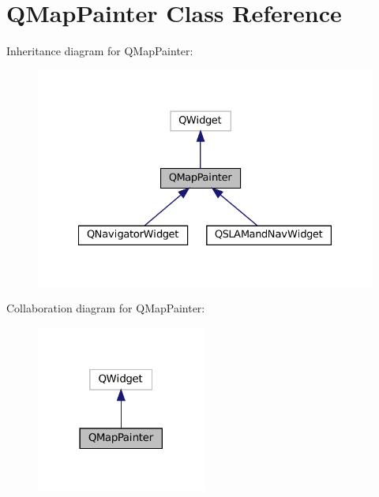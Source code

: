 \hypertarget{classQMapPainter}{}\section{Q\+Map\+Painter Class Reference}
\label{classQMapPainter}


Inheritance diagram for Q\+Map\+Painter\+:
\nopagebreak
\begin{figure}[H]
\begin{center}
\leavevmode
\includegraphics[width=328pt]{classQMapPainter__inherit__graph}
\end{center}
\end{figure}


Collaboration diagram for Q\+Map\+Painter\+:
\nopagebreak
\begin{figure}[H]
\begin{center}
\leavevmode
\includegraphics[width=158pt]{classQMapPainter__coll__graph}
\end{center}
\end{figure}
